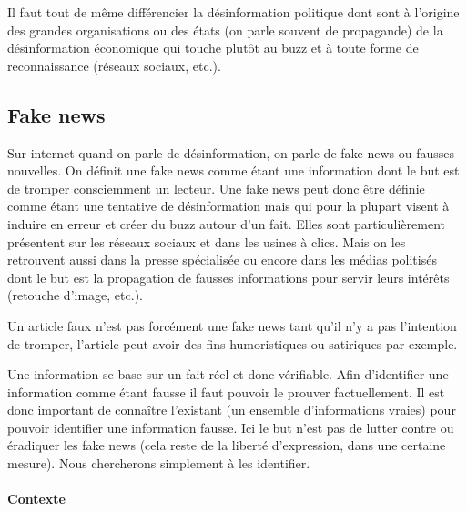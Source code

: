 Il faut tout de même différencier la désinformation politique dont sont à l'origine des grandes organisations ou des états (on parle souvent de propagande) de la désinformation économique qui touche plutôt au buzz et à toute forme de reconnaissance (réseaux sociaux, etc.).

\subsection{Fake news}

Sur internet quand on parle de désinformation, on parle de fake news ou fausses nouvelles. On définit une fake news comme étant une information dont le but est de tromper consciemment un lecteur. Une fake news peut donc être définie comme étant une tentative de désinformation mais qui pour la plupart visent à induire en erreur et créer du buzz autour d'un fait. Elles sont particulièrement présentent sur les réseaux sociaux et dans les usines à clics. Mais on les retrouvent aussi dans la presse spécialisée ou encore dans les médias politisés dont le but est la propagation de fausses informations pour servir leurs intérêts (retouche d'image, etc.).  

Un article faux n'est pas forcément une fake news tant qu'il n'y a pas l'intention de tromper, l'article peut avoir des fins humoristiques ou satiriques par exemple.

Une information se base sur un fait réel et donc vérifiable. Afin d'identifier une information comme étant fausse il faut pouvoir le prouver factuellement. Il est donc important de connaître l'existant (un ensemble d'informations vraies) pour pouvoir identifier une information fausse. Ici le but n'est pas de lutter contre ou éradiquer les fake news (cela reste de la liberté d'expression, dans une certaine mesure). Nous chercherons simplement à les identifier.

\paragraph{Contexte}


